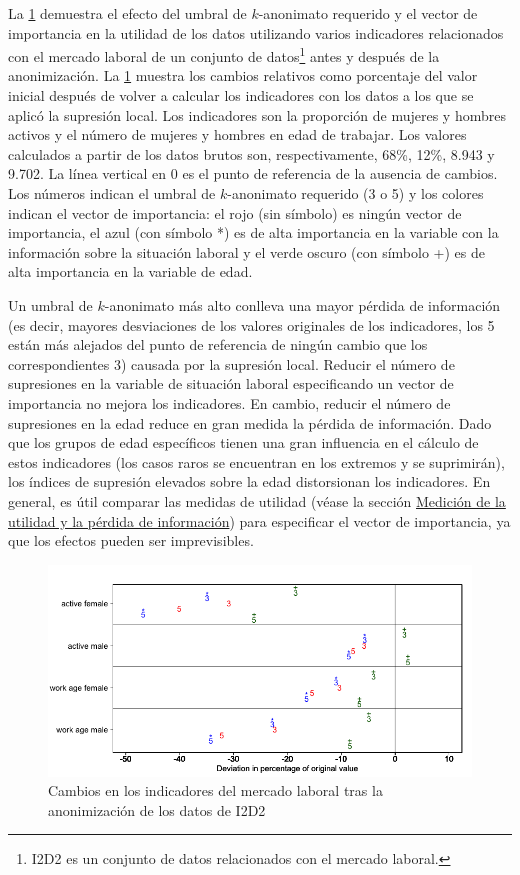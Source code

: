 \documentclass[]{book}
\theoremstyle{definition}
\theoremstyle{definition}
\theoremstyle{definition}
\theoremstyle{definition}
\theoremstyle{remark}
\begin{document}
La \ref{fig:fig8} demuestra el efecto del umbral de \(k\)-anonimato requerido y el vector de importancia en la utilidad de los datos utilizando varios indicadores relacionados con el mercado laboral de un conjunto de datos\footnote{I2D2 es un conjunto de datos relacionados con el mercado laboral.} antes y después de la anonimización. La \ref{fig:fig8} muestra los cambios relativos como porcentaje del valor inicial después de volver a calcular los indicadores con los datos a los que se aplicó la supresión local. Los indicadores son la proporción de mujeres y hombres activos y el número de mujeres y hombres en edad de trabajar. Los valores calculados a partir de los datos brutos son, respectivamente, 68\%, 12\%, 8.943 y 9.702. La línea vertical en 0 es el punto de referencia de la ausencia de cambios. Los números indican el umbral de \(k\)-anonimato requerido (3 o 5) y los colores indican el vector de importancia: el rojo (sin símbolo) es ningún vector de importancia, el azul (con símbolo *) es de alta importancia en la variable con la información sobre la situación laboral y el verde oscuro (con símbolo +) es de alta importancia en la variable de edad.

Un umbral de \(k\)-anonimato más alto conlleva una mayor pérdida de información (es decir, mayores desviaciones de los valores originales de los indicadores, los 5 están más alejados del punto de referencia de ningún cambio que los correspondientes 3) causada por la supresión local. Reducir el número de supresiones en la variable de situación laboral especificando un vector de importancia no mejora los indicadores. En cambio, reducir el número de supresiones en la edad reduce en gran medida la pérdida de información. Dado que los grupos de edad específicos tienen una gran influencia en el cálculo de estos indicadores (los casos raros se encuentran en los extremos y se suprimirán), los índices de supresión elevados sobre la edad distorsionan los indicadores. En general, es útil comparar las medidas de utilidad (véase la sección \protect\hyperlink{mediciuxf3n-de-la-utilidad-y-la-puxe9rdida-de-informaciuxf3n}{Medición de la utilidad y la pérdida de información}) para especificar el vector de importancia, ya que los efectos pueden ser imprevisibles.

\begin{figure}
\includegraphics[width=1\linewidth]{Imagenes/image7} \caption{Cambios en los indicadores del mercado laboral tras la anonimización de los datos de I2D2}\label{fig:fig8}
\end{figure}
\end{document}
